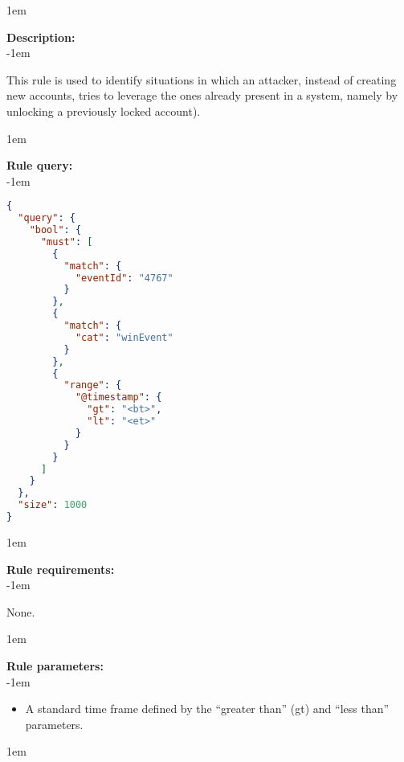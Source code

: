 \openup 1em

{\bf Description:} \\

\openup -1em
\vspace{-2em}


This rule is used to identify situations in which an attacker, instead of creating new accounts, tries to leverage the ones already present in a system, namely by unlocking a previously locked account).

\openup 1em

{\bf Rule query:} \\

\openup -1em
\vspace{-2em}

\begin{lstlisting}[language=json,firstnumber=1]
{
  "query": {
    "bool": {
      "must": [
        {
          "match": {
            "eventId": "4767"
          }
        },
        {
          "match": {
            "cat": "winEvent"
          }
        },
        {
          "range": {
            "@timestamp": {
              "gt": "<bt>",
              "lt": "<et>"
            }
          }
        }
      ]
    }
  },
  "size": 1000
}
\end{lstlisting}

\openup 1em

{\bf Rule requirements:} \\

\openup -1em
\vspace{-2em}

None.

\openup 1em

{\bf Rule parameters:} \\

\openup -1em
\vspace{-2em}

\begin{itemize}
	\item A standard time frame defined by the ``greater than'' (gt) and ``less than'' parameters.
\end{itemize}

\openup 1em

